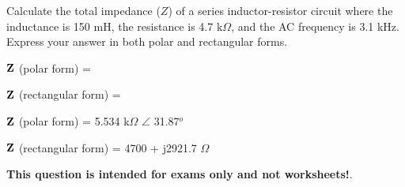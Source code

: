 

Calculate the total impedance ($Z$) of a series inductor-resistor circuit where the inductance is 150 mH, the resistance is 4.7 k$\Omega$, and the AC frequency is 3.1 kHz.  Express your answer in both polar and rectangular forms.

\vskip 10pt

${\bf Z}$ (polar form) = 

\vskip 10pt

${\bf Z}$ (rectangular form) = 







${\bf Z}$ (polar form) = 5.534 k$\Omega$ $\angle$ 31.87$^{o}$

\vskip 10pt

${\bf Z}$ (rectangular form) = 4700 + j2921.7 $\Omega$







{\bf This question is intended for exams only and not worksheets!}.



